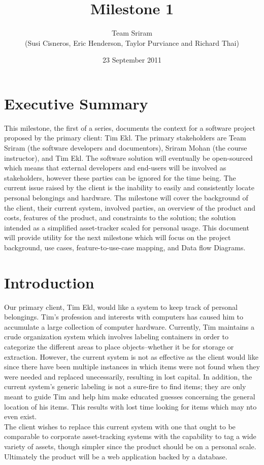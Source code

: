 \documentclass{article}
\begin{document}
\setlength{\voffset}{3.5in}
\title{Milestone 1}
\author{Team Sriram\\
(Susi Cisneros, Eric Henderson, Taylor Purviance and Richard Thai)}
\date{23 September 2011}
\maketitle
\clearpage
\setlength{\voffset}{0pt}
\tableofcontents
\clearpage
\section{Executive Summary}
This milestone, the first of a series, documents the context for a software project proposed by the primary client: Tim Ekl. The primary stakeholders are Team Sriram (the software developers and documentors), Sriram Mohan (the course instructor), and Tim Ekl.  The software solution will eventually be open-sourced which means that external developers and end-users will be involved as stakeholders, however these parties can be ignored for the time being. The current issue raised by the client is the inability to easily and consistently locate personal belongings and hardware. Ths milestone will cover the background of the client, their current system, involved parties, an overview of the product and costs, features of the product, and constraints to the solution; the solution intended as a simplified asset-tracker scaled for personal usage. This document will provide utility for the next milestone which will focus on the project background, use cases, feature-to-use-case mapping, and Data flow Diagrams.

\section{Introduction}
Our primary client, Tim Ekl, would like a system to keep track of personal belongings. Tim's profession and interests with computers has caused him to accumulate a large collection of computer hardware. Currently, Tim maintains a crude organization system which involves labeling containers in order to categorize the different areas to place objects--whether it be for storage or extraction. However, the current system is not as effective as the client would like since there have been multiple instances in which items were not found when they were needed and replaced unecessarily, resulting in lost capital. In addition, the current system's generic labeling is not a sure-fire to find items; they are only meant to guide Tim and help him make educated guesses concerning the general location of his items. This results with lost time looking for items which may nto even exist.\\
The client wishes to replace this current system with one that ought to be comparable to corporate asset-tracking systems with the capability to tag a wide variety of assets, though simpler since the product should be on a personal scale. Ultimately the product will be a web application backed by a database.
\end{document}
